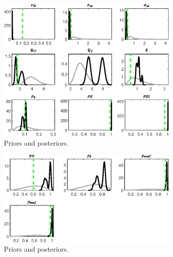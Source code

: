 \begin{figure}[H]
\centering
\includegraphics[width=0.80\textwidth]{BRS_sectoral_wo_gmf/Output/BRS_sectoral_wo_gmf_PriorsAndPosteriors3}
\caption{Priors and posteriors.}\label{Fig:PriorsAndPosteriors:3}
\end{figure}
 
\begin{figure}[H]
\centering
\includegraphics[width=0.80\textwidth]{BRS_sectoral_wo_gmf/Output/BRS_sectoral_wo_gmf_PriorsAndPosteriors4}
\caption{Priors and posteriors.}\label{Fig:PriorsAndPosteriors:4}
\end{figure}
 
